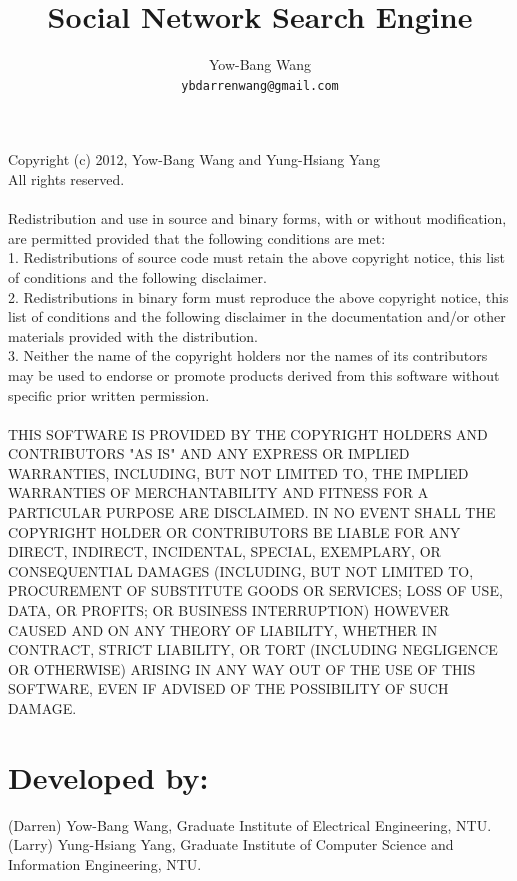 \documentclass[12pt]{article}
\title{Social Network Search Engine}
\author{Yow-Bang Wang\\
\texttt{ybdarrenwang@gmail.com}}
\begin{document}
\maketitle

{\footnotesize
\noindent
Copyright (c) 2012, Yow-Bang Wang and Yung-Hsiang Yang\\
All rights reserved.\\
\\
Redistribution and use in source and binary forms, with or without modification, are permitted provided that the following conditions are met:\\
1. Redistributions of source code must retain the above copyright notice, this list of conditions and the following disclaimer.\\
2. Redistributions in binary form must reproduce the above copyright notice, this list of conditions and the following disclaimer in the documentation and/or other materials provided with the distribution.\\
3. Neither the name of the copyright holders nor the names of its contributors may be used to endorse or promote products derived from this software without specific prior written permission.\\
\\
THIS SOFTWARE IS PROVIDED BY THE COPYRIGHT HOLDERS AND CONTRIBUTORS "AS IS" AND ANY EXPRESS OR IMPLIED WARRANTIES, INCLUDING, BUT NOT LIMITED TO, THE IMPLIED WARRANTIES OF MERCHANTABILITY AND FITNESS FOR A PARTICULAR PURPOSE ARE DISCLAIMED. IN NO EVENT SHALL THE COPYRIGHT HOLDER OR CONTRIBUTORS BE LIABLE FOR ANY DIRECT, INDIRECT, INCIDENTAL, SPECIAL, EXEMPLARY, OR CONSEQUENTIAL DAMAGES (INCLUDING, BUT NOT LIMITED TO, PROCUREMENT OF SUBSTITUTE GOODS OR SERVICES; LOSS OF USE, DATA, OR PROFITS; OR BUSINESS INTERRUPTION) HOWEVER CAUSED AND ON ANY THEORY OF LIABILITY, WHETHER IN CONTRACT, STRICT LIABILITY, OR TORT (INCLUDING NEGLIGENCE OR OTHERWISE) ARISING IN ANY WAY OUT OF THE USE OF THIS SOFTWARE, EVEN IF ADVISED OF THE POSSIBILITY OF SUCH DAMAGE.\\
}

\section*{Developed by:}
\noindent
(Darren) Yow-Bang Wang, Graduate Institute of Electrical Engineering, NTU.\\
(Larry) Yung-Hsiang Yang, Graduate Institute of Computer Science and Information Engineering, NTU.\\
\end{document}
